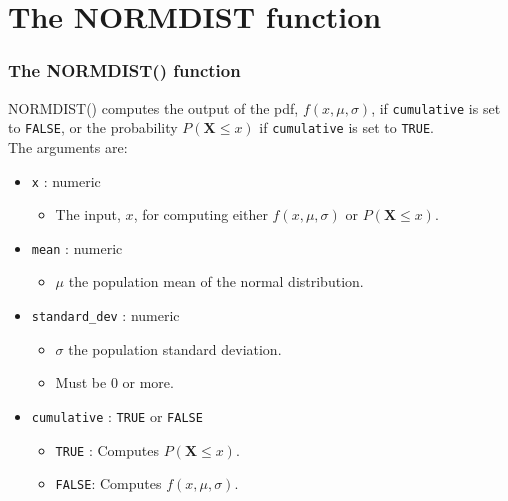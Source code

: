 \documentclass[12pt]{beamer}
\begin{document}
\section{The NORMDIST function}
	\begin{frame}
		\frametitle{The NORMDIST() function}
		NORMDIST() computes the output of the pdf, $f(x,\mu,\sigma)$,  if \texttt{cumulative} is set to \texttt{FALSE}, or the probability $P(\textbf{X}\leq x)$ if  \texttt{cumulative} is set to \texttt{TRUE}. \\
		The arguments are:
		\begin{itemize}
			\item \texttt{x} : numeric
				\begin{itemize}
					\item The input, $x$, for computing either $f(x,\mu, \sigma)$ or $P(\textbf{X}\leq x)$.
				\end{itemize}
			\item \texttt{mean} : numeric
				\begin{itemize}
					\item $\mu$ the population mean of the normal distribution. 
				\end{itemize}
			\item \texttt{standard\_dev} : numeric
				\begin{itemize}
					\item $\sigma$ the population standard deviation.
					\item Must be 0 or more. 
				\end{itemize}
			\item \texttt{cumulative} : \texttt{TRUE} or \texttt{FALSE}
				\begin{itemize}
					\item \texttt{TRUE} : Computes $P(\textbf{X}\leq x)$.
					\item \texttt{FALSE}: Computes $f(x,\mu, \sigma)$.
				\end{itemize}
		\end{itemize}
		
	\end{frame}
\end{document}
